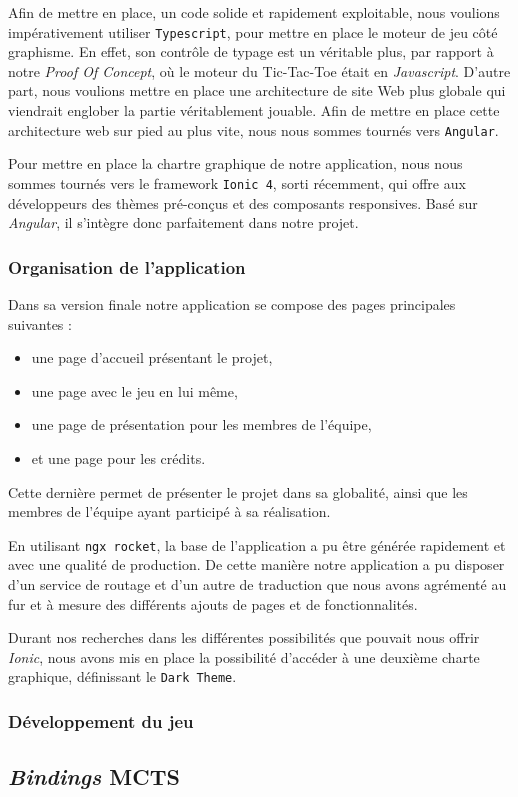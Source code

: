 \documentclass[a4paper,11pt]{article}
\providecommand{\tightlist}{%
  \setlength{\itemsep}{0pt}\setlength{\parskip}{0pt}}
\begin{document}
Afin de mettre en place, un code solide et rapidement exploitable, nous
voulions impérativement utiliser \texttt{Typescript}, pour mettre en
place le moteur de jeu côté graphisme. En effet, son contrôle de typage
est un véritable plus, par rapport à notre \emph{Proof Of Concept}, où
le moteur du Tic-Tac-Toe était en \emph{Javascript}. D'autre part, nous
voulions mettre en place une architecture de site Web plus globale qui
viendrait englober la partie véritablement jouable. Afin de mettre en
place cette architecture web sur pied au plus vite, nous nous sommes
tournés vers \texttt{Angular}.

Pour mettre en place la chartre graphique de notre application, nous
nous sommes tournés vers le framework \texttt{Ionic\ 4}, sorti
récemment, qui offre aux développeurs des thèmes pré-conçus et des
composants responsives. Basé sur \emph{Angular}, il s'intègre donc
parfaitement dans notre projet.

\hypertarget{organisation-de-lapplication}{%
\subsubsection{Organisation de
l'application}\label{organisation-de-lapplication}}

Dans sa version finale notre application se compose des pages
principales suivantes :

\begin{itemize}
\tightlist
\item
  une page d'accueil présentant le projet,
\item
  une page avec le jeu en lui même,
\item
  une page de présentation pour les membres de l'équipe,
\item
  et une page pour les crédits.
\end{itemize}

Cette dernière permet de présenter le projet dans sa globalité, ainsi
que les membres de l'équipe ayant participé à sa réalisation.

En utilisant \texttt{ngx\ rocket}, la base de l'application a pu être
générée rapidement et avec une qualité de production. De cette manière
notre application a pu disposer d'un service de routage et d'un autre de
traduction que nous avons agrémenté au fur et à mesure des différents
ajouts de pages et de fonctionnalités.

Durant nos recherches dans les différentes possibilités que pouvait nous
offrir \emph{Ionic}, nous avons mis en place la possibilité d'accéder à
une deuxième charte graphique, définissant le \texttt{Dark\ Theme}.

\hypertarget{duxe9veloppement-du-jeu}{%
\subsubsection{Développement du jeu}\label{duxe9veloppement-du-jeu}}

\hypertarget{bindings-mcts}{%
\subsection{\texorpdfstring{\emph{Bindings}
MCTS}{Bindings MCTS}}\label{bindings-mcts}}

% 

\end{document}

